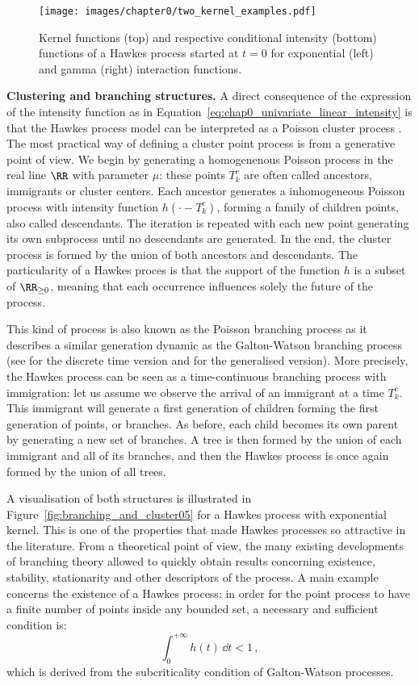     \begin{figure}[!ht]
        \centering
          \texttt{[image: images/chapter0/two\_kernel\_examples.pdf]}
        \caption{Kernel functions (top) and respective conditional intensity (bottom) functions of a Hawkes process started at $t=0$ for exponential (left) and gamma (right) interaction functions.
        }
        \label{fig:chap0_two_kernel_examples}
      \end{figure}

    \textbf{Clustering and branching structures.}
    A direct consequence of the expression of the intensity function as in Equation~\eqref{eq:chap0_univariate_linear_intensity} is that the Hawkes process model can be interpreted as a Poisson cluster process \parencite{Hawkes1974}.
    The most practical way of defining a cluster point process \parencite{Bartlett1963} is from a generative point of view.
    We begin by generating a homogenenous Poisson process in the real line $\RR$ with parameter $\mu$: these points $T_k^c$ are often called ancestors, immigrants or cluster centers.
    Each ancestor generates a inhomogeneous Poisson process with intensity function $h(\cdot - T_k^c)$, forming a family of children points, also called descendants.
    The iteration is repeated with each new point generating its own subprocess until no descendants are generated.
    In the end, the cluster process is formed by the union of both ancestors and descendants.
    The particularity of a Hawkes proces is that the support of the function $h$ is a subset of $\RR_{\geq0}$, meaning that each occurrence influences solely the future of the process.

    This kind of process is also known as the Poisson branching process \parencite{Lewis1964} as it describes a similar generation dynamic as the Galton-Watson branching process (see \parencite{Watson1875} for the discrete time version and \textcite[Chapter III]{Harris02} for the generalised version).
    More precisely, the Hawkes process can be seen as a time-continuous branching process with immigration:
    let us assume we observe the arrival of an immigrant at a time $T_k^c$.
    This immigrant will generate a first generation of children forming the first generation of points, or branches.
    As before, each child becomes its own parent by generating a new set of branches.
    A tree is then formed by the union of each immigrant and all of its branches, and then the Hawkes process is once again formed by the union of all trees.

    A visualisation of both structures is illustrated in Figure~\ref{fig:branching_and_cluster05} for a Hawkes process with exponential kernel. 
    This is one of the properties that made Hawkes processes so attractive in the literature.
    From a theoretical point of view, the many existing developments of branching theory allowed to quickly obtain results concerning existence, stability, stationarity and other descriptors of the process.
    A main example concerns the existence of a Hawkes process: in order for the point process to have a finite number of points inside any bounded set, a necessary and sufficient condition is:
    \[\int_{0}^{+\infty}{h(t)\,\dd t} < 1\,,\]
    which is derived from the subcriticality condition of Galton-Watson processes.

